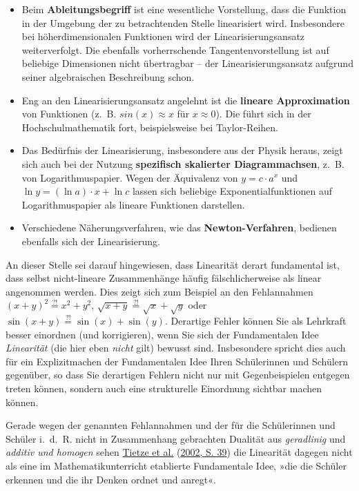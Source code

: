 \documentclass[
  ngerman,
]{scrbook}
\providecommand{\tightlist}{%
  \setlength{\itemsep}{0pt}\setlength{\parskip}{0pt}}
\theoremstyle{definition}
\theoremstyle{definition}
\theoremstyle{definition}
\theoremstyle{definition}
\theoremstyle{remark}
\begin{document}
\begin{itemize}
\tightlist
\item
  Beim \textbf{Ableitungsbegriff} ist eine wesentliche Vorstellung, dass die Funktion in der Umgebung der zu betrachtenden Stelle linearisiert wird. Insbesondere bei höherdimensionalen Funktionen wird der Linearisierungsansatz weiterverfolgt. Die ebenfalls vorherrschende Tangentenvorstellung ist auf beliebige Dimensionen nicht übertragbar -- der Linearisierungsansatz aufgrund seiner algebraischen Beschreibung schon.\\
\item
  Eng an den Linearisierungsansatz angelehnt ist die \textbf{lineare Approximation} von Funktionen (z.~B. \(sin(x)\approx x\) für \(x\approx 0\)). Die führt sich in der Hochschulmathematik fort, beispielsweise bei Taylor-Reihen.\\
\item
  Das Bedürfnis der Linearisierung, insbesondere aus der Physik heraus, zeigt sich auch bei der Nutzung \textbf{spezifisch skalierter Diagrammachsen}, z.~B. von Logarithmuspapier. Wegen der Äquivalenz von \(y = c\cdot a^x\) und \(\ln y = (\ln a )\cdot x + \ln c\) lassen sich beliebige Exponentialfunktionen auf Logarithmuspapier als lineare Funktionen darstellen.
\item
  Verschiedene Näherungsverfahren, wie das \textbf{Newton-Verfahren}, bedienen ebenfalls sich der Linearisierung.
\end{itemize}

An dieser Stelle sei darauf hingewiesen, dass Linearität derart fundamental ist, dass selbst nicht-lineare Zusammenhänge häufig fälschlicherweise als linear angenommen werden. Dies zeigt sich zum Beispiel an den Fehlannahmen \((x+y)^2 \overset{?!}{=} x^2+y^2\), \(\sqrt{x+y} \overset{?!}{=} \sqrt{x}+\sqrt{y}\) oder \(\sin(x+y) \overset{?!}{=} \sin(x)+\sin(y)\). Derartige Fehler können Sie als Lehrkraft besser einordnen (und korrigieren), wenn Sie sich der Fundamentalen Idee \emph{Linearität} (die hier eben \emph{nicht} gilt) bewusst sind. Insbesondere spricht dies auch für ein Explizitmachen der Fundamentalen Idee Ihren Schülerinnen und Schülern gegenüber, so dass Sie derartigen Fehlern nicht nur mit Gegenbeispielen entgegen treten können, sondern auch eine strukturelle Einordnung sichtbar machen können.

Gerade wegen der genannten Fehlannahmen und der für die Schülerinnen und Schüler i.~d.~R. nicht in Zusammenhang gebrachten Dualität aus \emph{geradlinig} und \emph{additiv und homogen} sehen \protect\hyperlink{ref-Tietze:2002}{Tietze et al.} (\protect\hyperlink{ref-Tietze:2002}{2002, S. 39}) die Linearität dagegen nicht als eine im Mathematikunterricht etablierte Fundamentale Idee, »die die Schüler erkennen und die ihr Denken ordnet und anregt«.
\end{document}
